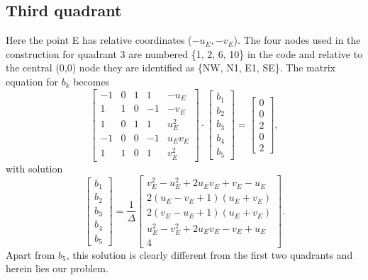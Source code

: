 \documentclass[12pt,letterpaper,margin=0.5in]{article}
\begin{document}
\subsection{Third quadrant}
Here the point E has relative coordinates ($-u_E, -v_E$).  The four nodes used in the
construction for quadrant 3 are numbered \{1, 2, 6, 10\} in the code and relative to the central (0,0) node they
are identified as \{NW, N1, E1, SE\}. The matrix equation for $b_k$ becomes
\begin{equation}
\left[ {\begin{array}{*{20}{r}}
{ - 1}&0&1&1&{ - {u_E}}\\
1&1&0&{ - 1}&{ - {v_E}}\\
1&0&1&1&{u_E^2}\\
{ - 1}&0&0&{ - 1}&{{u_E}{v_E}}\\
1&1&0&1&{v_E^2}
\end{array}} \right] \cdot \left[ {\begin{array}{*{20}{c}}
{{b_1}}\\
{{b_2}}\\
{{b_3}}\\
{{b_4}}\\
{{b_5}}
\end{array}} \right] = \left[ {\begin{array}{*{20}{c}}
0\\
0\\
2\\
0\\
2
\end{array}} \right],
\end{equation}
with solution
\begin{equation}
\left[ {\begin{array}{*{20}{c}}
{{b_1}}\\
{{b_2}}\\
{{b_3}}\\
{{b_4}}\\
{{b_5}}
\end{array}} \right] = \frac{1}{\Delta }\left[ {\begin{array}{*{20}{c}}
{v_E^2 - u_E^2 + 2{u_E}{v_E} + {v_E} - {u_E}}\\[4pt]
{2\left( {{u_E} - {v_E} + 1} \right)\left( {{u_E} + {v_E}} \right)}\\[4pt]
{2\left( {{v_E} - {u_E} + 1} \right)\left( {{u_E} + {v_E}} \right)}\\[4pt]
{u_E^2 - v_E^2 + 2{u_E}{v_E} - {v_E} + {u_E}}\\[4pt]
4
\end{array}} \right].
\label{eq:lower}
\end{equation}
Apart from $b_5$, this solution is clearly different from the first two quadrants and herein lies our problem.
\end{document}

